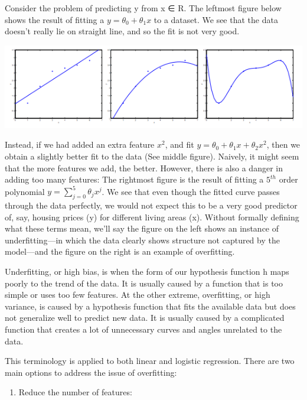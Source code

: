 \documentclass[
]{book}
\providecommand{\tightlist}{%
  \setlength{\itemsep}{0pt}\setlength{\parskip}{0pt}}
\begin{document}
Consider the problem of predicting y from x ∈ R. The leftmost figure below shows the result of fitting a \(y = θ_0 + θ_1x\) to a dataset. We see that the data doesn't really lie on straight line, and so the fit is not very good.

\includegraphics{Overfitting.png}

Instead, if we had added an extra feature \(x^2\), and fit \(y = \theta_0 + \theta_1x + \theta_2x^2\), then we obtain a slightly better fit to the data (See middle figure). Naively, it might seem that the more features we add, the better. However, there is also a danger in adding too many features: The rightmost figure is the result of fitting a \(5^{th}\) order polynomial \(y = \sum_{j=0} ^5 \theta_j x^j\). We see that even though the fitted curve passes through the data perfectly, we would not expect this to be a very good predictor of, say, housing prices (y) for different living areas (x). Without formally defining what these terms mean, we'll say the figure on the left shows an instance of underfitting---in which the data clearly shows structure not captured by the model---and the figure on the right is an example of overfitting.

Underfitting, or high bias, is when the form of our hypothesis function h maps poorly to the trend of the data. It is usually caused by a function that is too simple or uses too few features. At the other extreme, overfitting, or high variance, is caused by a hypothesis function that fits the available data but does not generalize well to predict new data. It is usually caused by a complicated function that creates a lot of unnecessary curves and angles unrelated to the data.

This terminology is applied to both linear and logistic regression. There are two main options to address the issue of overfitting:

\begin{enumerate}
\def\labelenumi{\arabic{enumi})}
\tightlist
\item
  Reduce the number of features:
\end{enumerate}
\end{document}
